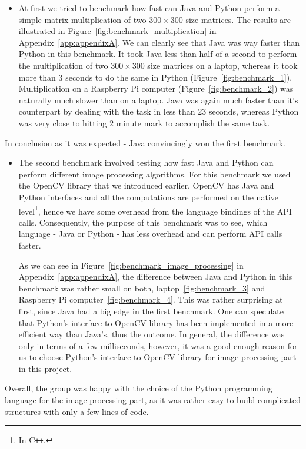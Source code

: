 \begin{itemize}
\item At first we tried to benchmark how fast can Java and Python perform a simple matrix multiplication of two $300 \times 300$ size matrices. The results are illustrated in Figure~\ref{fig:benchmark_multiplication} in Appendix~\ref{app:appendixA}. We can clearly see that Java was way faster than Python in this benchmark. It took Java less than half of a second to perform the multiplication of two $300 \times 300$ size matrices on a laptop, whereas it took more than 3 seconds to do the same in Python (Figure~\ref{fig:benchmark_1}). Multiplication on a Raspberry Pi computer (Figure~\ref{fig:benchmark_2}) was naturally much slower than on a laptop. Java was again much faster than it's counterpart by dealing with the task in less than 23 seconds, whereas Python was very close to hitting 2 minute mark to accomplish the same task.
\end{itemize}

In conclusion as it was expected - Java convincingly won the first benchmark.

\begin{itemize}
\item The second benchmark involved testing how fast Java and Python can perform different image processing algorithms. For this benchmark we used the OpenCV library that we introduced earlier. OpenCV has Java and Python interfaces and all the computations are performed on the native level\footnote{In C\texttt{++}.}, hence we have some overhead from the language bindings of the API calls. Consequently, the purpose of this benchmark was to see, which language - Java or Python - has less overhead and can perform API calls faster. 

As we can see in Figure~\ref{fig:benchmark_image_processing} in Appendix~\ref{app:appendixA}, the difference between Java and Python in this benchmark was rather small on both, laptop~\ref{fig:benchmark_3} and Raspberry Pi computer~\ref{fig:benchmark_4}. This was rather surprising at first, since Java had a big edge in the first benchmark. One can speculate that Python's interface to OpenCV library has been implemented in a more efficient way than Java's, thus the outcome. In general, the difference was only in terms of a few milliseconds, however, it was a good enough reason for us to choose Python's interface to OpenCV library for image processing part in this project.
\end{itemize}

Overall, the group was happy with the choice of the Python programming language for the image processing part, as it was rather easy to build complicated structures with only a few lines of code.